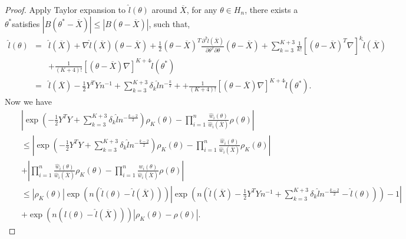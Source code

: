 \begin{proof}
Apply Taylor expansion to $\hat{l}\left(\theta\right)$ around $\overline{X}$,
for any $\theta\in H_{n}$, there exists a $\theta^{*}$satisfies
$\left|B\left(\theta^{*}-\overline{X}\right)\right|\le\left|B\left(\theta-\overline{X}\right)\right|$,
such that, 
\begin{eqnarray*}
\hat{l}\left(\theta\right) & = & \hat{l}\left(\overline{X}\right)+\nabla\hat{l}\left(\overline{X}\right)\left(\theta-\overline{X}\right)+\frac{1}{2}\left(\theta-\overline{X}\right)^{T}\frac{\partial^{2}\hat{l}\left(\overline{X}\right)}{\partial\theta^{T}\partial\theta}\left(\theta-\overline{X}\right)+\sum_{k=3}^{K+3}\frac{1}{k!}\left[\left(\theta-\overline{X}\right)^{T}\nabla\right]^{k}\hat{l}\left(\overline{X}\right)\\
 &  & +\frac{1}{\left(K+4\right)!}\left[\left(\theta-\overline{X}\right)\nabla\right]^{K+4}\hat{l}\left(\theta^{*}\right)\\
 & = & \hat{l}\left(\overline{X}\right)-\frac{1}{2}Y^{T}Yn^{-1}+\sum_{k=3}^{K+3}\delta_{k}\hat{l}n^{-\frac{k}{2}}++\frac{1}{\left(K+4\right)!}\left[\left(\theta-\overline{X}\right)\nabla\right]^{K+4}\hat{l}\left(\theta^{*}\right).
\end{eqnarray*}
Now we have 
\begin{eqnarray*}
 &  & \left|\exp\left(-\frac{1}{2}Y^{T}Y+\sum_{k=3}^{K+3}\delta_{k}\hat{l}n^{-\frac{k-2}{2}}\right)\rho_{K}\left(\theta\right)-\prod_{i=1}^{n}\frac{\hat{w}_{i}\left(\theta\right)}{\hat{w}_{i}\left(\overline{X}\right)}\rho\left(\theta\right)\right|\\
 &  & \le\left|\exp\left(-\frac{1}{2}Y^{T}Y+\sum_{k=3}^{K+3}\delta_{k}\hat{l}n^{-\frac{k-2}{2}}\right)\rho_{K}\left(\theta\right)-\prod_{i=1}^{n}\frac{\hat{w}_{i}\left(\theta\right)}{\hat{w}_{i}\left(\overline{X}\right)}\rho_{K}\left(\theta\right)\right|\\
 &  & +\left|\prod_{i=1}^{n}\frac{\hat{w}_{i}\left(\theta\right)}{\hat{w}_{i}\left(\overline{X}\right)}\rho_{K}\left(\theta\right)-\prod_{i=1}^{n}\frac{\hat{w}_{i}\left(\theta\right)}{\hat{w}_{i}\left(\overline{X}\right)}\rho\left(\theta\right)\right|\\
 &  & \le\left|\rho_{K}\left(\theta\right)\right|\exp\left(n\left(\hat{l}\left(\theta\right)-\hat{l}\left(\overline{X}\right)\right)\right)\left|\exp\left(n\left(\hat{l}\left(\overline{X}\right)-\frac{1}{2}Y^{T}Yn^{-1}+\sum_{k=3}^{K+3}\delta_{k}\hat{l}n^{-\frac{k-2}{2}}-\hat{l}\left(\theta\right)\right)\right)-1\right|\\
 &  & +\exp\left(n\left(\hat{l}\left(\theta\right)-\hat{l}\left(\overline{X}\right)\right)\right)\left|\rho_{K}\left(\theta\right)-\rho\left(\theta\right)\right|.

\end{eqnarray*}
\end{proof}
